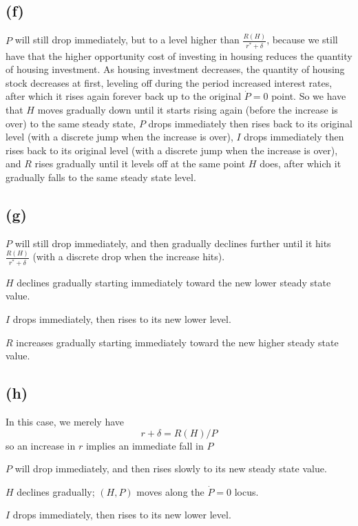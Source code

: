 \documentclass[11pt]{amsart}
\begin{document}
\subsection*{(f)}

$P$ will still drop immediately, but to a level higher than $\frac{R(H)}{r^{*} + \delta}$, because we still have that the higher opportunity cost of investing in housing reduces the quantity of housing investment.
As housing investment decreases, the quantity of housing stock decreases at first, leveling off during the period increased interest rates, after which it rises again forever back up to the original $\dot{P}=0$ point. 
So we have that $H$ moves gradually down until it starts rising again (before the increase is over) to the same steady state, $P$ drops immediately then rises back to its original level (with a discrete jump when the increase is over), $I$ drops immediately then rises back to its original level (with a discrete jump when the increase is over), and $R$ rises gradually until it levels off at the same point $H$ does, after which it gradually falls to the same steady state level.

\subsection*{(g)}

$P$ will still drop immediately, and then gradually declines further until it hits $\frac{R(H)}{r^{*} + \delta}$ (with a discrete drop when the increase hits).

$H$ declines gradually starting immediately toward the new lower steady state value. 

$I$ drops immediately, then rises to its new lower level.

$R$ increases gradually starting immediately toward the new higher steady state value.


\subsection*{(h)}

In this case, we merely have
\[
r + \delta = R(H) / P
\]
so an increase in $r$ implies an immediate fall in $P$

$P$ will drop immediately, and then rises slowly to its new steady state value. 

$H$ declines gradually; $(H,P)$ moves along the $\dot{P} = 0$ locus.

$I$ drops immediately, then rises to its new lower level.
\end{document}
